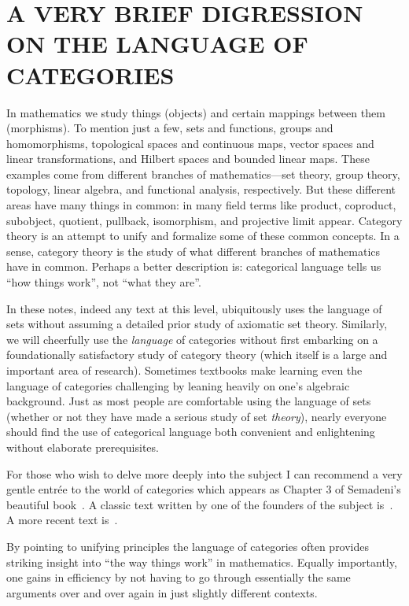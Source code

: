 \chapter{A VERY BRIEF DIGRESSION ON THE LANGUAGE OF CATEGORIES}\label{categories}

In mathematics we study things (objects) and certain mappings between them (morphisms).
To mention just a few, sets and functions, groups and homomorphisms, topological spaces
and continuous maps, vector spaces and linear transformations, and Hilbert spaces and
bounded linear maps.  These examples come from different branches of mathematics---set
theory, group theory, topology, linear algebra, and functional analysis, respectively.
But these different areas have many things in common: in many field terms like product,
coproduct, subobject, quotient, pullback, isomorphism, and projective limit  appear.
Category theory is an attempt to unify and formalize some of these common concepts.
In a sense, category theory is the study of what different branches of mathematics
have in common.  Perhaps a better description is: categorical language tells us ``how things work'',
not ``what they are''.

In these notes, indeed any text at this level, ubiquitously uses the language of sets without
assuming a detailed prior study of axiomatic set theory. Similarly, we will cheerfully use the
\emph{language} of categories without first embarking on a foundationally satisfactory study of
category theory (which itself is a large and important area of research).  Sometimes textbooks make
learning even the language of categories challenging by leaning heavily on one's algebraic background.
Just as most people are comfortable using the language of sets (whether or not they have made a serious
study of set \emph{theory}), nearly everyone should find the use of categorical language both convenient
and enlightening without elaborate prerequisites.

For those who wish to delve more deeply into the subject I can recommend a very gentle entr\'ee to the world
of categories which appears as Chapter 3 of Semadeni's beautiful book~\cite{Semadeni:1971}.  A classic
text written by one of the founders of the subject is~\cite{MacLane:1971}.  A more recent text is~\cite{LawvereS:1997}.

By pointing to unifying principles the language of categories often provides striking insight into
``the way things work'' in mathematics. Equally importantly, one gains in efficiency by not having to go
through essentially the same arguments over and over again in just slightly different contexts.

